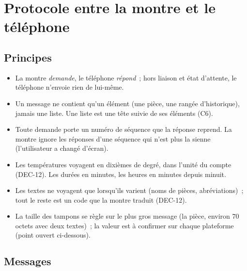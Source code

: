 \section{Protocole entre la montre et le téléphone}
\label{sec:protocole}

\subsection{Principes}

\begin{itemize}
  \item La montre \emph{demande}, le téléphone \emph{répond}~; hors liaison et état d'attente, le
        téléphone n'envoie rien de lui-même.
  \item Un message ne contient qu'un élément (une pièce, une rangée d'historique), jamais
        une liste. Une liste est une tête suivie de ses éléments (C6).
  \item Toute demande porte un numéro de séquence que la réponse reprend. La montre ignore les
        réponses d'une séquence qui n'est plus la sienne (l'utilisateur a changé d'écran).
  \item Les températures voyagent en dixièmes de degré, dans l'unité du compte (DEC-12). Les
        durées en minutes, les heures en minutes depuis minuit.
  \item Les textes ne voyagent que lorsqu'ils varient (noms de pièces, abréviations)~; tout le reste
        est un code que la montre traduit (DEC-12).
  \item La taille des tampons se règle sur le plus gros message (la pièce, environ 70 octets avec
        deux textes)~; la valeur est à confirmer sur chaque plateforme (point ouvert ci-dessous).
\end{itemize}


\subsection{Messages}

